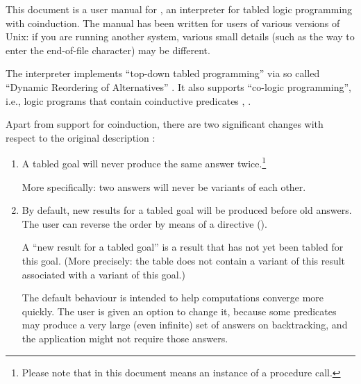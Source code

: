 

This document is a user manual for , an interpreter for tabled
logic programming with coinduction.  The manual has been written for users of
various versions of Unix: if you are running another system, various small
details (such as the way to enter the end-of-file character) may be
different.

The interpreter implements ``top-down tabled programming'' via so called
``Dynamic Reordering of Alternatives'' \cite{guo-gupta-dra}.  It also
supports ``co-logic programming'', i.e., logic programs that contain
coinductive predicates \cite{coinductive}, \cite{co-LP}.


Apart from support for coinduction, there are two significant changes with
respect to the original description \cite{guo-gupta-dra}:
\begin{enumerate}

\item
  A tabled goal will never produce the same answer twice.\footnote{
  Please note that in this document  means an instance of a
  procedure call.}

  More specifically: two answers will never be variants of each
  other.

\item
  By default, new results for a tabled goal will be produced before old
  answers.  The user can reverse the order by means of a directive
  ().

  A ``new result for a tabled goal'' is a result that has not yet been
  tabled for this goal.  (More precisely: the table does not contain a
  variant of this result associated with a variant of this goal.)

  The default behaviour is intended to help computations converge more
  quickly.  The user is given an option to change it, because some predicates
  may produce a very large (even infinite) set of answers on backtracking,
  and the application might not require those answers.
\end{enumerate}



